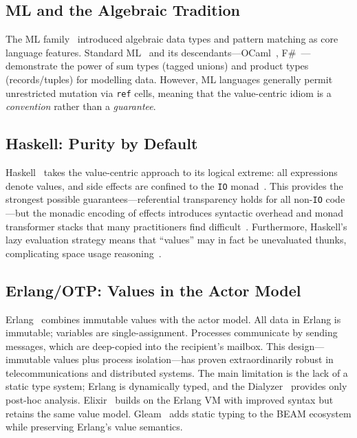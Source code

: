 \documentclass[11pt]{article}
\theoremstyle{definition}
\theoremstyle{remark}
\begin{document}
\subsection{ML and the Algebraic Tradition}

The ML family~\cite{milner1978theory,milner1997definition} introduced
algebraic data types and pattern matching as core language features.
Standard ML~\cite{milner1997definition} and its descendants---OCaml~\cite{leroy2014ocaml},
F\#~\cite{syme2010expert}---demonstrate the power of sum types (tagged
unions) and product types (records/tuples) for modelling data.
However, ML languages generally permit unrestricted mutation via
\texttt{ref} cells, meaning that the value-centric idiom is a
\emph{convention} rather than a \emph{guarantee}.

\subsection{Haskell: Purity by Default}

Haskell~\cite{jones2003haskell,marlow2010haskell} takes the value-centric
approach to its logical extreme: all expressions denote values, and
side effects are confined to the \texttt{IO} monad~\cite{peyton1993imperative}.
This provides the strongest possible guarantees---referential transparency
holds for all non-\texttt{IO} code---but the monadic encoding of
effects introduces syntactic overhead and monad transformer stacks that
many practitioners find difficult~\cite{kiselyov2013extensible}.  Furthermore,
Haskell's lazy evaluation strategy means that ``values'' may in fact be
unevaluated thunks, complicating space usage reasoning~\cite{jones1999playing}.

\subsection{Erlang/OTP: Values in the Actor Model}

Erlang~\cite{armstrong2007programming,armstrong1996concurrent} combines
immutable values with the actor model.  All data in Erlang is
immutable; variables are single-assignment.  Processes communicate by
sending messages, which are deep-copied into the recipient's mailbox.
This design---immutable values plus process isolation---has proven
extraordinarily robust in telecommunications and distributed systems.
The main limitation is the lack of a static type system; Erlang is
dynamically typed, and the Dialyzer~\cite{lindahl2006practical}
provides only post-hoc analysis.  Elixir~\cite{valim2014elixir}
builds on the Erlang VM with improved syntax but retains the same
value model.  Gleam~\cite{gleam2024} adds static typing to the BEAM
ecosystem while preserving Erlang's value semantics.
\end{document}
